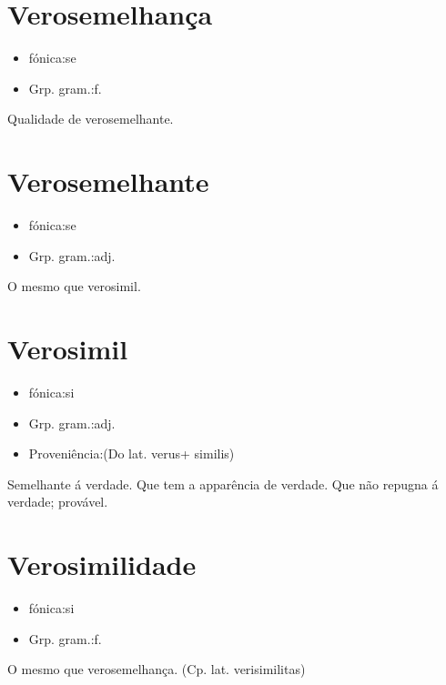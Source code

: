 \documentclass{article}
\begin{document}
\section{Verosemelhança}
\begin{itemize}
\item {fónica:se}
\end{itemize}
\begin{itemize}
\item {Grp. gram.:f.}
\end{itemize}
Qualidade de verosemelhante.
\section{Verosemelhante}
\begin{itemize}
\item {fónica:se}
\end{itemize}
\begin{itemize}
\item {Grp. gram.:adj.}
\end{itemize}
O mesmo que \textunderscore verosimil\textunderscore .
\section{Verosimil}
\begin{itemize}
\item {fónica:si}
\end{itemize}
\begin{itemize}
\item {Grp. gram.:adj.}
\end{itemize}
\begin{itemize}
\item {Proveniência:(Do lat. \textunderscore verus\textunderscore  + \textunderscore similis\textunderscore )}
\end{itemize}
Semelhante á verdade.
Que tem a apparência de verdade.
Que não repugna á verdade; provável.
\section{Verosimilidade}
\begin{itemize}
\item {fónica:si}
\end{itemize}
\begin{itemize}
\item {Grp. gram.:f.}
\end{itemize}
O mesmo que \textunderscore verosemelhança\textunderscore .
(Cp. lat. \textunderscore verisimilitas\textunderscore )
\end{document}
